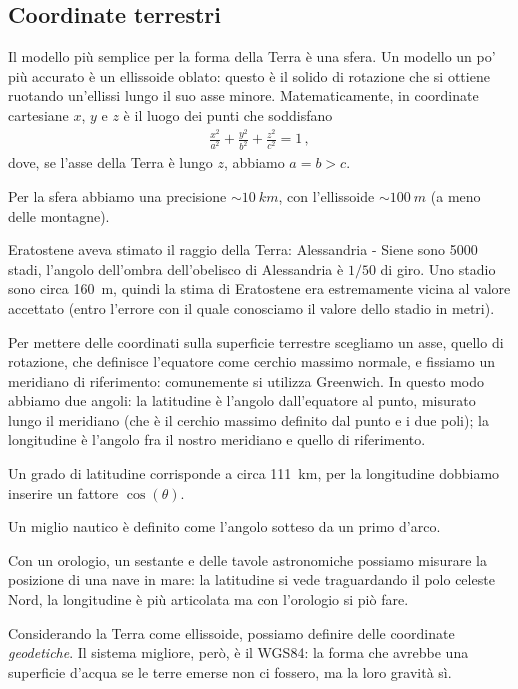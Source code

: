 \documentclass[main.tex]{subfiles}
\begin{document}
\subsection{Coordinate terrestri}


Il modello più semplice per la forma della Terra è una sfera.
Un modello un po' più accurato è un ellissoide oblato: questo è il solido di rotazione che si ottiene ruotando un'ellissi lungo il suo asse minore. Matematicamente, in coordinate cartesiane \(x\), \(y\) e \(z\) è il luogo dei punti che soddisfano 
%
\begin{align}
\frac{x^2}{a^2} + \frac{y^2}{b^2} + \frac{z^2}{c^2} = 1
\,,
\end{align}
%
dove, se l'asse della Terra è lungo \(z\), abbiamo \(a = b > c\).

Per la sfera abbiamo una precisione \(\sim \SI{10}{km}\), con l'ellissoide \(\sim \SI{100}{m}\) (a meno delle montagne).

Eratostene aveva stimato il raggio della Terra: Alessandria - Siene sono \num{5000} stadi, l'angolo dell'ombra dell'obelisco di Alessandria è \(1/50\) di giro. 
Uno stadio sono circa \SI{160}{m}, quindi la stima di Eratostene era estremamente vicina al valore accettato (entro l'errore con il quale conosciamo il valore dello stadio in metri).

Per mettere delle coordinati sulla superficie terrestre scegliamo un asse, quello di rotazione, che definisce l'equatore come cerchio massimo normale, e fissiamo un meridiano di riferimento: comunemente si utilizza Greenwich. 
In questo modo abbiamo due angoli: la latitudine è l'angolo dall'equatore al punto, misurato lungo il meridiano (che è il cerchio massimo definito dal punto e i due poli); la longitudine è l'angolo fra il nostro meridiano e quello di riferimento. 

Un grado di latitudine corrisponde a circa \SI{111}{km}, per la longitudine dobbiamo inserire un fattore \(\cos(\theta )\). 

Un miglio nautico è definito come l'angolo sotteso da un primo d'arco. 

Con un orologio, un sestante e delle tavole astronomiche possiamo misurare la posizione di una nave in mare: la latitudine si vede traguardando il polo celeste Nord, la longitudine è più articolata ma con l'orologio si piò fare.

Considerando la Terra come ellissoide, possiamo definire delle coordinate \emph{geodetiche}.
Il sistema migliore, però, è il WGS84: la forma che avrebbe una superficie d'acqua se le terre emerse non ci fossero, ma la loro gravità sì. 
\end{document}
